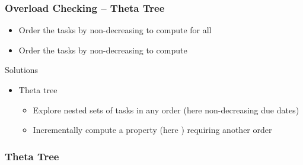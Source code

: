 \begin{frame}
\frametitle{Overload Checking -- Theta Tree}
\begin{itemize}
	\item Order the tasks by non-decreasing  to compute  for all 
	\item Order the tasks by non-decreasing  to compute 
\end{itemize}

\begin{myblock}{Solutions}
	\begin{itemize}
		\item Theta tree 
		\begin{itemize}
			\item Explore nested sets of tasks in any order (here non-decreasing due dates)
			\item Incrementally compute a property (here ) requiring another order
		\end{itemize}
	\end{itemize}
\end{myblock}
\end{frame}


\begin{frame}
\frametitle{Theta Tree}
\begin{center}
	\begin{colorschedfigure}{.38}
		
	\end{colorschedfigure}

\end{center}
\end{frame}



